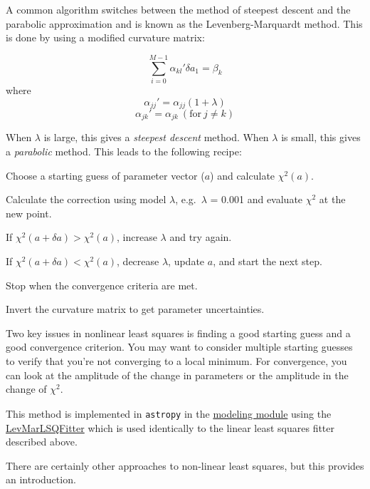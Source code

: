 \documentclass[12pt]{article}
\begin{document}
A common algorithm switches between the method of steepest descent and
the parabolic approximation and is known as the Levenberg-Marquardt
method. This is done by using a modified curvature matrix:

$$ \sum_{i=0}^{M-1} \alpha_{kl}'\delta{a_1} = \beta_{k} $$
where
$$ \alpha_{jj}' = \alpha_{jj}(1+\lambda) $$
$$ \alpha_{jk}' = \alpha_{jk}\ (\textrm{for}\ j \neq k) $$

When $\lambda$ is large, this gives a \emph{steepest descent} method.
When $\lambda$ is small, this gives a \emph{parabolic} method.
This leads to the following recipe:
\begin{enumerate*}
    \item Choose a starting guess of parameter vector ($a$) and
        calculate $\chi^2(a)$.
    \item Calculate the correction using model $\lambda$,
        e.g.\ $\lambda$ = 0.001 and evaluate $\chi^2$ at the new point.
    \item If $\chi^2(a + \delta a) > \chi^2(a)$, increase $\lambda$ and try again.
    \item If $\chi^2(a + \delta a) < \chi^2(a)$, decrease $\lambda$,
        update $a$, and start the next step.
    \item Stop when the convergence criteria are met.
    \item Invert the curvature matrix to get parameter uncertainties.
\end{enumerate*}

Two key issues in nonlinear least squares is finding a good starting
guess and a good convergence criterion. You may want to consider
multiple starting guesses to verify that you're not converging to a
local minimum. For convergence, you can look at the amplitude of the
change in parameters or the amplitude in the change of $ \chi^{2}_{}$.

This method is implemented in \texttt{astropy} in the
\href{http://astropy.readthedocs.org/en/v1.0.6/modeling/index.html}
{modeling module} using the
\href{http://docs.astropy.org/en/stable/api/astropy.modeling.fitting.LevMarLSQFitter.html}
{LevMarLSQFitter} which is used identically to the linear least squares
fitter described above.

There are certainly other approaches to non-linear least squares, but
this provides an introduction.
\end{document}
